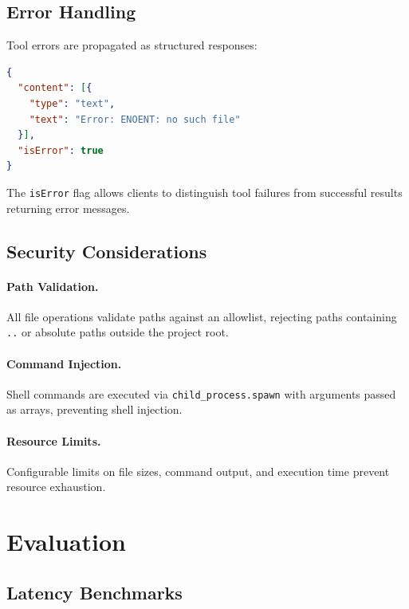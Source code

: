 \documentclass[11pt,twocolumn]{article}
\begin{document}
\subsection{Error Handling}

Tool errors are propagated as structured responses:

\begin{lstlisting}[language=JSON]
{
  "content": [{
    "type": "text",
    "text": "Error: ENOENT: no such file"
  }],
  "isError": true
}
\end{lstlisting}

The \texttt{isError} flag allows clients to distinguish tool failures from successful results returning error messages.

\subsection{Security Considerations}

\paragraph{Path Validation.} All file operations validate paths against an allowlist, rejecting paths containing \texttt{..} or absolute paths outside the project root.

\paragraph{Command Injection.} Shell commands are executed via \texttt{child\_process.spawn} with arguments passed as arrays, preventing shell injection.

\paragraph{Resource Limits.} Configurable limits on file sizes, command output, and execution time prevent resource exhaustion.

\section{Evaluation}

\subsection{Latency Benchmarks}
\end{document}
